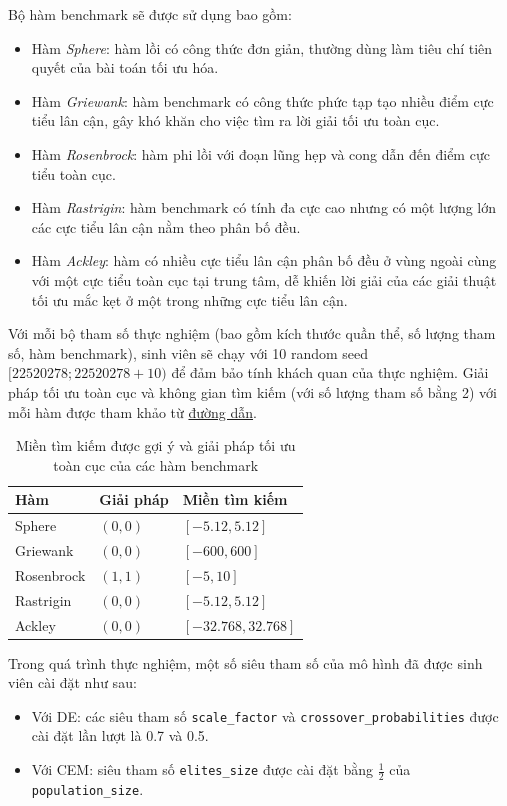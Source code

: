 \documentclass[10pt]{report}
\begin{document}
Bộ hàm benchmark sẽ được sử dụng bao gồm:
\begin{itemize}
	\item Hàm \emph{Sphere}: hàm lồi có công thức đơn giản, thường dùng làm tiêu chí tiên quyết của bài toán tối ưu hóa.
	\item Hàm \emph{Griewank}: hàm benchmark có công thức phức tạp tạo nhiều điểm cực tiểu lân cận, gây khó khăn cho việc tìm ra lời giải tối ưu toàn cục.
	\item Hàm \emph{Rosenbrock}: hàm phi lồi với đoạn lũng hẹp và cong dẫn đến điểm cực tiểu toàn cục.
	\item Hàm \emph{Rastrigin}: hàm benchmark có tính đa cực cao nhưng có một lượng lớn các cực tiểu lân cận nằm theo phân bố đều.
	\item Hàm \emph{Ackley}: hàm có nhiều cực tiểu lân cận phân bố đều ở vùng ngoài cùng với một cực tiểu toàn cục tại trung tâm, dễ khiến lời giải của các giải thuật tối ưu mắc kẹt ở một trong những cực tiểu lân cận.
\end{itemize}

Với mỗi bộ tham số thực nghiệm (bao gồm kích thước quần thể, số lượng tham số, hàm benchmark), sinh viên sẽ chạy với 10 random seed \([22520278; 22520278 + 10)\) để đảm bảo tính khách quan của thực nghiệm. Giải pháp tối ưu toàn cục và không gian tìm kiếm (với số lượng tham số bằng 2) với mỗi hàm được tham khảo từ \href{https://www.sfu.ca/~ssurjano/optimization.html}{đường dẫn}.

\begin{table}[H]\centering
	\caption{Miền tìm kiếm được gợi ý và giải pháp tối ưu toàn cục của các hàm benchmark}
	\begin{tabularx}{0.6\textwidth}{XXX}
		\toprule
		\textbf{Hàm} & \textbf{Giải pháp} & \textbf{Miền tìm kiếm} \\
		\midrule
		Sphere       & \((0, 0)\)         & \([-5.12, 5.12]\)      \\
		Griewank     & \((0, 0)\)         & \([-600, 600]\)        \\
		Rosenbrock   & \((1, 1)\)         & \([-5, 10]\)           \\
		Rastrigin    & \((0, 0)\)         & \([-5.12, 5.12]\)      \\
		Ackley       & \((0, 0)\)         & \([-32.768, 32.768]\)  \\
		\bottomrule
	\end{tabularx}
\end{table}

Trong quá trình thực nghiệm, một số siêu tham số của mô hình đã được sinh viên cài đặt như sau:
\begin{itemize}
	\item Với DE: các siêu tham số \texttt{scale\_factor} và \texttt{crossover\_probabilities} được cài đặt lần lượt là 0.7 và 0.5.
	\item Với CEM: siêu tham số \texttt{elites\_size} được cài đặt bằng \(\frac{1}{2}\) của \texttt{population\_size}.
\end{itemize}
\end{document}
